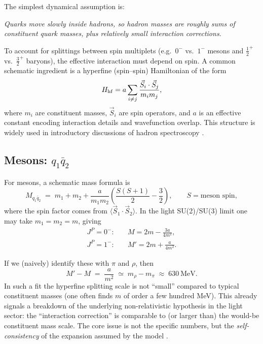 The simplest dynamical assumption is:
\begin{center}
\emph{Quarks move slowly inside hadrons, so hadron masses are roughly sums of constituent quark masses,
plus relatively small interaction corrections.}
\end{center}

To account for splittings between spin multiplets (e.g.\ $0^-$ vs.\ $1^-$ mesons and
$\tfrac12^+$ vs.\ $\tfrac32^+$ baryons), the effective interaction must depend on spin.
A common schematic ingredient is a hyperfine (spin--spin) Hamiltonian of the form
\begin{equation}
H_{\rm hf} = a \sum_{i\neq j}\frac{\vec S_i\cdot \vec S_j}{m_i m_j},
\label{eq:hf_hamiltonian}
\end{equation}
where $m_i$ are constituent masses, $\vec S_i$ are spin operators,
and $a$ is an effective constant encoding interaction details and wavefunction overlap.
This structure is widely used in introductory discussions of hadron spectroscopy
\citep{halzen1984,griffiths2008,thomson2013}.

\subsection{Mesons: $q_1\bar q_2$}

For mesons, a schematic mass formula is
\begin{equation}
M_{q_1\bar q_2} \;=\; m_1 + m_2
+ \frac{a}{m_1 m_2}\left(\frac{S(S+1)}{2}-\frac{3}{2}\right),
\qquad S=\text{meson spin},
\label{eq:meson_mass_formula}
\end{equation}
where the spin factor comes from $\langle \vec S_1\cdot \vec S_2\rangle$.
In the light SU(2)/SU(3) limit one may take $m_1=m_2=m$, giving
\begin{align}
J^P=0^-:\quad & M = 2m - \frac{3a}{4m^2},
\label{eq:ps_mass}
\\
J^P=1^-:\quad & M' = 2m + \frac{a}{4m^2}.
\label{eq:v_mass}
\end{align}

If we (naively) identify these with $\pi$ and $\rho$, then
\begin{equation}
M'-M \;=\; \frac{a}{m^2} \;\simeq\; m_\rho - m_\pi \;\approx\; 630~\text{MeV}.
\label{eq:meson_split_scale}
\end{equation}
In such a fit the hyperfine splitting scale is not ``small'' compared to typical constituent masses
(one often finds $m$ of order a few hundred MeV).
This already signals a breakdown of the underlying non-relativistic hypothesis in the light sector:
the ``interaction correction'' is comparable to (or larger than) the would-be constituent mass scale.
The core issue is not the specific numbers, but the \emph{self-consistency} of the expansion
assumed by the model \citep{griffiths2008,thomson2013}.

